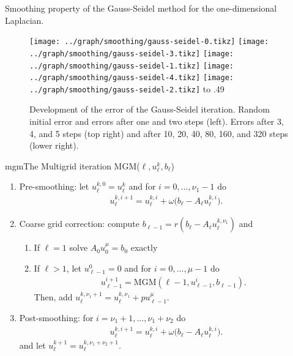 \def\restrict{r}
\def\prolongate{p}
\begin{example}
  Smoothing property of the Gauss-Seidel method for the one-dimensional Laplacian.
  \begin{figure}[tp]
    \begin{center}
      \texttt{[image: ../graph/smoothing/gauss-seidel-0.tikz]}
      \texttt{[image: ../graph/smoothing/gauss-seidel-3.tikz]}
      \texttt{[image: ../graph/smoothing/gauss-seidel-1.tikz]}
      \texttt{[image: ../graph/smoothing/gauss-seidel-4.tikz]}
      \texttt{[image: ../graph/smoothing/gauss-seidel-2.tikz]}
      \hbox to .49\textwidth{}
    \end{center}
    \caption{Development of the error of the Gauss-Seidel iteration. Random initial error and errors after one and two steps (left). Errors after 3, 4, and 5 steps (top right) and after 10, 20, 40, 80, 160, and 320 steps (lower right).}
  \end{figure}
\end{example}
\begin{Algorithm*}{mgm}{The Multigrid iteration MGM($\ell, u_\ell^{k}, b_\ell$)}
  \begin{enumerate}
  \item Pre-smoothing: let $u_\ell^{k,0} = u_\ell^{k}$ and for
    $i=0,\dots,\nu_1-1$ do
    \begin{gather}
      u_\ell^{k,i+1} = u_\ell^{k,i}
      + \omega\bigl(b_\ell - A_\ell u_\ell^{k,i}\bigr).
    \end{gather}
  \item Coarse grid correction: compute
    $b_{\ell-1} = \restrict(b_\ell - A_\ell u_\ell^{k,\nu_1})$ and
    \begin{enumerate}
    \item If $\ell=1$ solve $A_0 u_0^{\mu} = b_0$ exactly
    \item If $\ell>1$, let $u_{\ell-1}^0 = 0$ and for $i=0,\dots,\mu-1$ do
      \begin{gather*}
        u_{\ell-1}^{i+1} = \text{MGM}(\ell-1, u_{\ell-1}^{i},b_{\ell-1}).
      \end{gather*}
      Then, add
      $u_\ell^{k,\nu_1+1} = u_\ell^{k,\nu_1} + \prolongate u_{\ell-1}^{\mu}$.
    \end{enumerate}
  \item Post-smoothing: for $i=\nu_1+1,\dots,\nu_1+\nu_2$ do
    \begin{gather}
      u_\ell^{k,i+1} = u_\ell^{k,i}
      + \omega\bigl(b_\ell - A_\ell u_\ell^{k,i}\bigr).
    \end{gather}
    and let
    $u_\ell^{k+1}=u_\ell^{k,\nu_1+\nu_2+1}$.
  \end{enumerate}
\end{Algorithm*}

